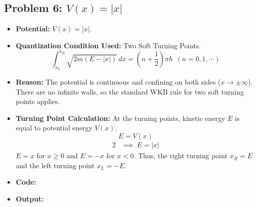 \documentclass[12pt, a4paper, twoside]{article}
\begin{document}
        \subsection{Problem 6: \texorpdfstring{$V(x) = |x|$}{V(x) = |x|}}
        \begin{itemize}
            \item {\bf Potential: } $V(x) = |x|$.
            \item {\bf Quantization Condition Used: } Two Soft Turning Points. $${\int_{x_L}^{x_R} \sqrt{2m(E - |x|)} \, dx} = {\left(n + \frac{1}{2}\right) \pi \hbar} ~~ (n = 0, 1, \cdots)$$
            \item {\bf Reason: }  The potential is continuous and confining on both sides ($x \to \pm \infty$). There are no infinite walls, so the standard WKB rule for two soft turning points applies.
            \item {\bf Turning Point Calculation: } At the turning points, kinetic energy $E$ is equal to potential energy $V(x)$. $$E = V(x)$$ \begin{alignat*}{2}
                &\implies ~ E = |x|
            \end{alignat*}
            $E = x $ for $x \geq 0$ and $E = -x$ for $x < 0$.
            Thus, the right turning point $ \boxed{x_R = E}$ and the left turning point $\boxed{x_L = -E}$.
            \item {\bf Code: } 
            \item {\bf Output: } 
        \end{itemize}
\end{document}
